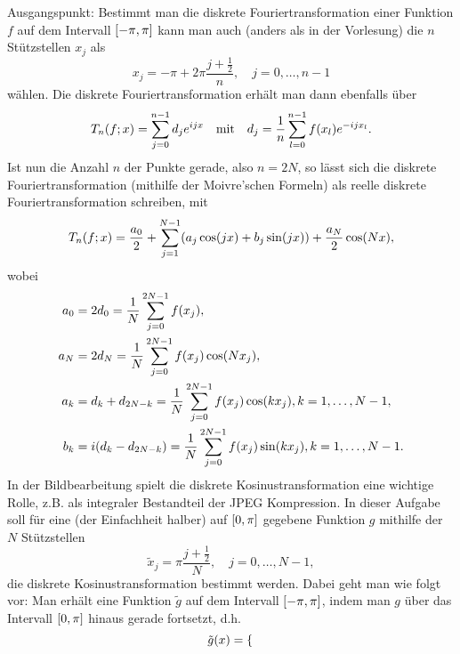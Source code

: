 \documentclass{exercise}
\begin{document}
    \begin{problem}
        Ausgangspunkt: Bestimmt man die diskrete Fouriertransformation einer Funktion \(f\) auf dem Intervall \(\brackets*{-\pi, \pi}\) kann man auch (anders als in der Vorlesung) die \(n\) Stützstellen \(x_j\) als
        \[
            x_j = -\pi + 2\pi\frac{j + \frac{1}{2}}{n}, \quad j = 0, \ldots, n - 1
        \]
        wählen.
        Die diskrete Fouriertransformation erhält man dann ebenfalls über
        \[
            T_n\parentheses*{f; x} = \sum_{j = 0}^{n - 1}d_j e^{ijx} \quad \text{mit} \quad d_j = \frac{1}{n}\sum_{l = 0}^{n - 1}f\parentheses*{x_l}e^{-ijx_l}.
        \]
        Ist nun die Anzahl \(n\) der Punkte gerade, also \(n = 2N\), so lässt sich die diskrete Fouriertransformation (mithilfe der Moivre'schen Formeln) als reelle diskrete Fouriertransformation schreiben, mit
        \begin{equation}\label{eq:1}
            T_n\parentheses*{f; x} = \frac{a_0}{2} + \sum_{j = 1}^{N - 1}\parentheses*{a_j\cos\parentheses*{jx} + b_j\sin\parentheses*{jx}} + \frac{a_N}{2}\cos\parentheses*{Nx},
        \end{equation}
        wobei
        \begin{align*}
            a_0 &= 2d_0 = \frac{1}{N}\sum_{j = 0}^{2N - 1}f\parentheses*{x_j},\\
            a_N &= 2d_N = \frac{1}{N}\sum_{j = 0}^{2N - 1}f\parentheses*{x_j}\cos\parentheses*{Nx_j},\\
            a_k &= d_k + d_{2N - k} = \frac{1}{N}\sum_{j = 0}^{2N - 1}f\parentheses*{x_j}\cos\parentheses*{kx_j}, k = 1, \ldots, N - 1,\\
            b_k &= i\parentheses*{d_k - d_{2N - k}} = \frac{1}{N}\sum_{j = 0}^{2N - 1}f\parentheses*{x_j}\sin\parentheses*{kx_j}, k = 1, \ldots, N - 1.
        \end{align*}
        In der Bildbearbeitung spielt die diskrete Kosinustransformation eine wichtige Rolle, z.B. als integraler Bestandteil der JPEG Kompression.
        In dieser Aufgabe soll für eine (der Einfachheit halber) auf \(\brackets*{0, \pi}\) gegebene Funktion \(g\) mithilfe der \(N\) Stützstellen
        \[
            \tilde{x}_j = \pi\frac{j + \frac{1}{2}}{N}, \quad j = 0, \ldots, N - 1,
        \]
        die diskrete Kosinustransformation bestimmt werden.
        Dabei geht man wie folgt vor: Man erhält eine Funktion \(\tilde{g}\) auf dem Intervall \(\brackets*{-\pi, \pi}\), indem man \(g\) über das Intervall \(\brackets*{0, \pi}\) hinaus gerade fortsetzt, d.h.
        \[
            \tilde{g}\parentheses*{x} = \begin{cases}

\end{cases}\]
\end{problem}
\end{document}
